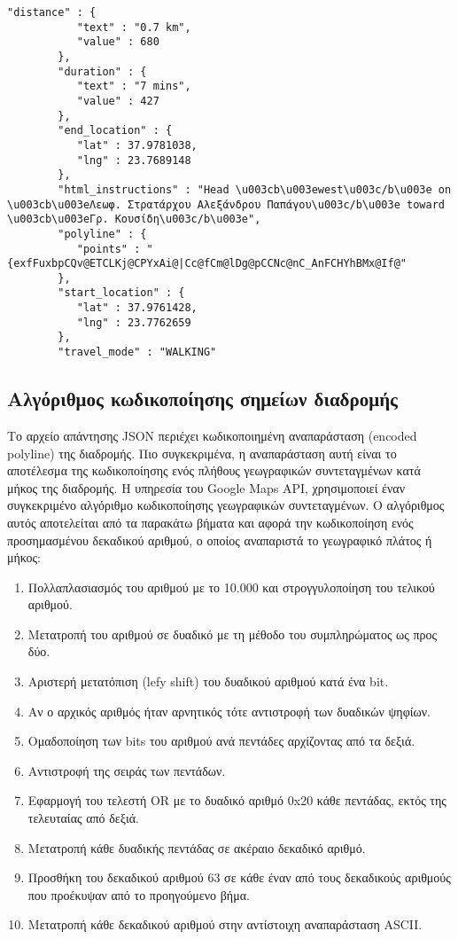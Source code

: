 \begin{lstlisting}[basicstyle=\footnotesize\ttfamily, breaklines=true]
	"distance" : {
           "text" : "0.7 km",
           "value" : 680
        },
        "duration" : {
           "text" : "7 mins",
           "value" : 427
        },
        "end_location" : {
           "lat" : 37.9781038,
           "lng" : 23.7689148
        },
        "html_instructions" : "Head \u003cb\u003ewest\u003c/b\u003e on \u003cb\u003eΛεωφ. Στρατάρχου Αλεξάνδρου Παπάγου\u003c/b\u003e toward \u003cb\u003eΓρ. Κουσίδη\u003c/b\u003e",
        "polyline" : {
           "points" : "{exfFuxbpCQv@ETCLKj@CPYxAi@|Cc@fCm@lDg@pCCNc@nC_AnFCHYhBMx@If@"
        },
        "start_location" : {
           "lat" : 37.9761428,
           "lng" : 23.7762659
        },
        "travel_mode" : "WALKING"
\end{lstlisting}


\subsection{Αλγόριθμος κωδικοποίησης σημείων διαδρομής}

Το αρχείο απάντησης JSON περιέχει κωδικοποιημένη αναπαράσταση (encoded polyline) της διαδρομής. Πιο συγκεκριμένα, η αναπαράσταση αυτή είναι το αποτέλεσμα της 
κωδικοποίησης ενός πλήθους γεωγραφικών συντεταγμένων κατά μήκος της διαδρομής. Η υπηρεσία του Google Maps API, χρησιμοποιεί έναν συγκεκριμένο αλγόριθμο κωδικοποίησης 
γεωγραφικών συντεταγμένων. Ο αλγόριθμος αυτός αποτελείται από τα παρακάτω βήματα και αφορά την κωδικοποίηση ενός προσημασμένου δεκαδικού αριθμού, ο οποίος 
αναπαριστά το γεωγραφικό πλάτος ή μήκος:

\begin{enumerate}
 \item Πολλαπλασιασμός του αριθμού με το 10.000 και στρογγυλοποίηση του τελικού αριθμού.
 \item Μετατροπή του αριθμού σε δυαδικό με τη μέθοδο του συμπληρώματος ως προς δύο.
 \item Αριστερή μετατόπιση (lefy shift) του δυαδικού αριθμού κατά ένα bit.
 \item Αν ο αρχικός αριθμός ήταν αρνητικός τότε αντιστροφή των δυαδικών ψηφίων.
 \item Ομαδοποίηση των bits του αριθμού ανά πεντάδες αρχίζοντας από τα δεξιά.
 \item Αντιστροφή της σειράς των πεντάδων.
 \item Εφαρμογή του τελεστή OR με το δυαδικό αριθμό 0x20 κάθε πεντάδας, εκτός της τελευταίας από δεξιά.
 \item Μετατροπή κάθε δυαδικής πεντάδας σε ακέραιο δεκαδικό αριθμό.
 \item Προσθήκη του δεκαδικού αριθμού 63 σε κάθε έναν από τους δεκαδικούς αριθμούς που προέκυψαν από το προηγούμενο βήμα.
 \item Μετατροπή κάθε δεκαδικού αριθμού στην αντίστοιχη αναπαράσταση ASCII.
\end{enumerate}













